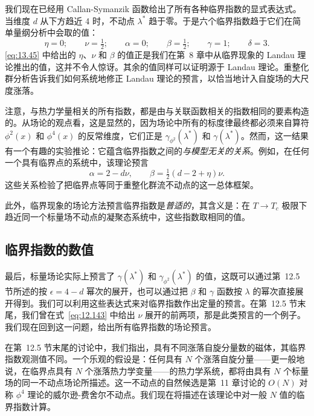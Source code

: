 我们现在已经用 Callan-Symanzik 函数给出了所有各种临界指数的显式表达式。当维度 $d$ 从下方趋近 4 时，不动点 $\lambda^{*}$ 趋于零。于是六个临界指数趋于它们在简单量纲分析中会取的值：
\begin{equation}
  \eta = 0;\qquad \nu = \tfrac{1}{2};\qquad \alpha = 0;\qquad
  \beta = \tfrac{1}{2};\qquad \gamma = 1;\qquad \delta = 3 .
  \label{eq:13.45}
\end{equation}
\eqref{eq:13.45} 中给出的 $\eta$、$\nu$ 和 $\beta$ 的值正是我们在第~8 章中从临界现象的 Landau 理论推出的值，这并不令人惊讶。其余的值同样可以证明源于 Landau 理论。重整化群分析告诉我们如何系统地修正 Landau 理论的预言，以恰当地计入自旋场的大尺度涨落。

注意，与热力学量相关的所有指数，都是由与关联函数相关的指数相同的要素构造的。从场论的观点看，这是显然的，因为场论中所有的标度律最终都必须来自算符 $\phi^2(x)$ 和 $\phi^4(x)$ 的反常维度，它们正是 $\gamma_{\phi^2}(\lambda^{*})$ 和 $\gamma(\lambda^{*})$。然而，这一结果有一个有趣的实验推论：它蕴含临界指数之间的\emph{与模型无关的关系}。例如，在任何一个具有临界点的系统中，该理论预言
\begin{equation}
  \alpha = 2 - d\nu,\qquad \beta = \tfrac{1}{2}(d-2+\eta)\nu .
  \label{eq:13.46}
\end{equation}
这些关系检验了把临界点等同于重整化群流不动点的这一总体框架。

此外，临界现象的场论方法预言临界指数是\emph{普适的}，其含义是：在 $T\to T_c$ 极限下趋近同一个标量场不动点的凝聚态系统中，这些指数取相同的值。

\subsection{临界指数的数值}

最后，标量场论实际上预言了 $\gamma(\lambda^{*})$ 和 $\gamma_{\phi^2}(\lambda^{*})$ 的值，这既可以通过第~12.5 节所述的按 $\epsilon = 4-d$ 幂次的展开，也可以通过把 $\beta$ 和 $\gamma$ 函数按 $\lambda$ 的幂次直接展开得到。我们可以利用这些表达式来对临界指数作出定量的预言。在第~12.5 节末尾，我们曾在式~\eqref{eq:12.143} 中给出 $\nu$ 展开的前两项，那是此类预言的一个例子。我们现在回到这一问题，给出所有临界指数的场论预言。

在第~12.5 节末尾的讨论中，我们指出，具有不同涨落自旋分量数的磁体，其临界指数观测值不同。一个乐观的假设是：任何具有 $N$ 个涨落自旋分量——更一般地说，在临界点具有 $N$ 个涨落热力学变量——的热力学系统，都将由具有 $N$ 个标量场的同一不动点场论所描述。这一不动点的自然候选是第~11 章讨论的 $O(N)$ 对称 $\phi^4$ 理论的威尔逊-费舍尔不动点。我们现在将描述在该理论中对一般 $N$ 值的临界指数计算。

